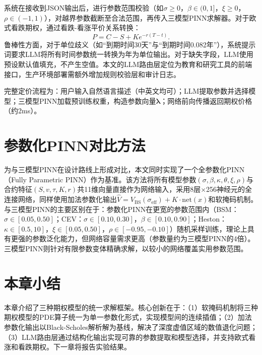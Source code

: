系统在接收到JSON输出后，进行参数范围校验（如$\sigma\geq 0$，$\beta\in(0,1]$，$\xi\geq 0$，$\rho\in(-1,1)$），对越界参数截断至合法范围，再传入三模型PINN求解器。对于欧式看跌期权，通过看跌-看涨平价关系转换：
\begin{equation}
  P = C - S + Ke^{-r(T-t)}.
\end{equation}
鲁棒性方面，对于单位歧义（如``到期时间30天''与``到期时间0.082年''），系统提示词要求LLM将所有时间参数统一转换为年为单位输出。对于缺失字段，LLM使用预设默认值填充，不产生空值。本文的LLM路由层定位为教育和研究工具的前端接口，生产环境部署需额外增加规则校验层和审计日志。

完整定价流程为：用户输入自然语言描述（中英文均可）；LLM提取参数并选择模型；三模型PINN加载预训练权重，构造参数向量$\boldsymbol{\lambda}$；网络前向传播返回期权价格（约2ms）。

\section{参数化PINN对比方法}\label{sec:parametric_pinn}

为与三模型PINN在设计路线上形成对比，本文同时实现了一个全参数化PINN（Fully Parametric PINN）作为基准。该方法将所有模型参数$(\sigma,\beta,\kappa,\theta,\xi,\rho)$与合约特征$(S,v,\tau,K,r)$共11维向量直接作为网络输入，采用8层$\times$256神经元的全连接网络，同样使用加法参数化输出$\hat{V}=V_{\mathrm{BS}}(\sigma_{\mathrm{eff}})+K\cdot\mathrm{net}(x)$和软掩码机制。与三模型PINN的主要区别在于：参数化PINN在更宽的参数范围内（BSM：$\sigma\in[0.05,0.50]$；CEV：$\sigma\in[0.10,0.30]$，$\beta\in[0.10,0.90]$；Heston：$\kappa\in[0.5,10]$，$\xi\in[0.05,0.50]$，$\rho\in[-0.95,-0.10]$）随机采样训练，理论上具有更强的参数泛化能力，但网络容量需求更高（参数量约为三模型PINN的4倍）。三模型PINN则针对有限参数变体精确求解，以较小的网络覆盖实用参数范围。

\section{本章小结}\label{sec:method_summary}

本章介绍了三种期权模型的统一求解框架。核心创新在于：（1）软掩码机制将三种期权模型的PDE算子统一为单一参数化形式，实现模型间的连续插值；（2）加法参数化输出以Black-Scholes解析解为基线，解决了深度虚值区域的数值退化问题；（3）LLM路由层通过结构化输出实现可靠的参数提取和模型选择，并支持欧式看涨和看跌期权。下一章将报告实验结果。
